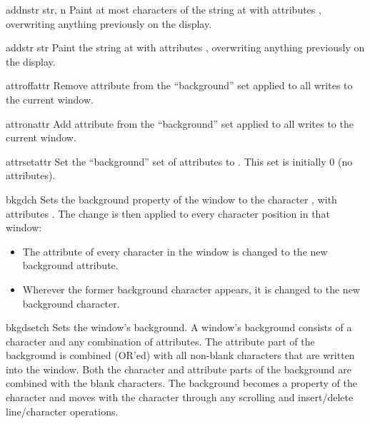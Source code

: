 \begin{methoddesc}[window]{addnstr}{ str, n}
Paint at most  characters of the 
string  at  with attributes
, overwriting anything previously on the display.
\end{methoddesc}

\begin{methoddesc}[window]{addstr}{ str}
Paint the string  at  with attributes
, overwriting anything previously on the display.
\end{methoddesc}

\begin{methoddesc}[window]{attroff}{attr}
Remove attribute  from the ``background'' set applied to all
writes to the current window.
\end{methoddesc}

\begin{methoddesc}[window]{attron}{attr}
Add attribute  from the ``background'' set applied to all
writes to the current window.
\end{methoddesc}

\begin{methoddesc}[window]{attrset}{attr}
Set the ``background'' set of attributes to .  This set is
initially 0 (no attributes).
\end{methoddesc}

\begin{methoddesc}[window]{bkgd}{ch}
Sets the background property of the window to the character ,
with attributes .  The change is then applied to every
character position in that window:
\begin{itemize}
\item  
The attribute of every character in the window  is
changed to the new background attribute.
\item
Wherever  the  former background character appears,
it is changed to the new background character.
\end{itemize}

\end{methoddesc}

\begin{methoddesc}[window]{bkgdset}{ch}
Sets the window's background.  A window's background consists of a
character and any combination of attributes.  The attribute part of
the background is combined (OR'ed) with all non-blank characters that
are written into the window.  Both the character and attribute parts
of the background are combined with the blank characters.  The
background becomes a property of the character and moves with the
character through any scrolling and insert/delete line/character
operations.
\end{methoddesc}

